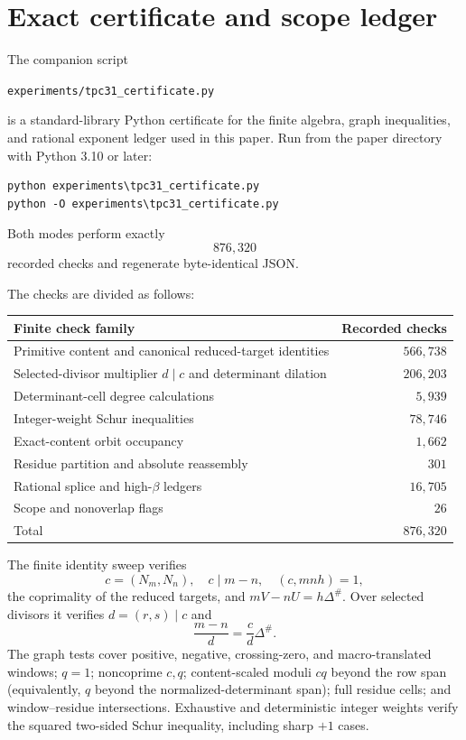 \section{Exact certificate and scope ledger}
\label{sec:tpc31-certificate}

The companion script
\begin{center}
\texttt{experiments/tpc31\_certificate.py}
\end{center}
is a standard-library Python certificate for the finite algebra,
graph inequalities, and rational exponent ledger used in this paper.
Run from the paper directory with Python 3.10 or later:
\begin{verbatim}
python experiments\tpc31_certificate.py
python -O experiments\tpc31_certificate.py
\end{verbatim}
Both modes perform exactly
\begin{equation}
 \boxed{876{,}320}
 \label{eq:tpc31-certificate-count}
\end{equation}
recorded checks and regenerate byte-identical JSON.

The checks are divided as follows:
\begin{center}
\begin{tabular}{@{}lr@{}}
\toprule
Finite check family & Recorded checks \\
\midrule
Primitive content and canonical reduced-target identities & $566{,}738$ \\
Selected-divisor multiplier $d\mid c$ and determinant dilation & $206{,}203$ \\
Determinant-cell degree calculations & $5{,}939$ \\
Integer-weight Schur inequalities & $78{,}746$ \\
Exact-content orbit occupancy & $1{,}662$ \\
Residue partition and absolute reassembly & $301$ \\
Rational splice and high-$\beta$ ledgers & $16{,}705$ \\
Scope and nonoverlap flags & $26$ \\
\midrule
Total & $876{,}320$ \\
\bottomrule
\end{tabular}
\end{center}

The finite identity sweep verifies
\[
 c=(N_m,N_n),\quad c\mid m-n,\quad (c,mnh)=1,
\]
the coprimality of the reduced targets, and
$mV-nU=h\Delta^\#$.  Over selected divisors it verifies
$d=(r,s)\mid c$ and
\[
 \frac{m-n}{d}=\frac cd\Delta^\#.
\]
The graph tests cover positive, negative, crossing-zero, and
macro-translated windows; $q=1$; noncoprime $c,q$; content-scaled
moduli $cq$ beyond the row span (equivalently, $q$ beyond the
normalized-determinant span); full residue cells; and window--residue
intersections.  Exhaustive and deterministic integer weights verify
the squared two-sided Schur inequality, including sharp $+1$ cases.

